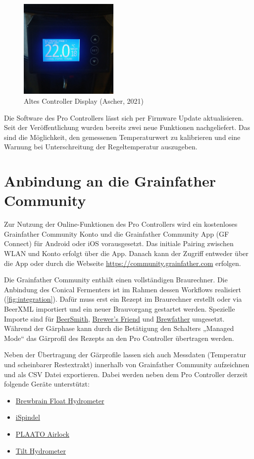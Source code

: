 \documentclass[a4paper,parskip=half]{scrartcl}
\begin{document}
\begin{figure}[H]
\centering
\includegraphics[width=4.8cm]{images/gfpc_display_old_main.jpg}
\caption{Altes Controller Display (Ascher, 2021)}
\label{fig:displayoldmain}
\end{figure}

Die Software des Pro Controllers lässt sich per Firmware Update
aktualisieren. Seit der Veröffentlichung wurden bereits zwei
neue Funktionen nachgeliefert. Das sind die Möglichkeit, den
gemessenen Temperaturwert zu kalibrieren und eine Warnung
bei Unterschreitung der Regeltemperatur auszugeben.

\section*{Anbindung an die Grainfather Community}

Zur Nutzung der Online-Funktionen des Pro Controllers wird ein
kostenloses Grainfather Community Konto und die Grainfather
Community App (GF Connect) für Android oder iOS vorausgesetzt.
Das initiale Pairing zwischen WLAN und Konto erfolgt über die App.
Danach kann der Zugriff entweder über die App oder durch die
Webseite \url{https://community.grainfather.com} erfolgen.

Die Grainfather Community enthält einen vollständigen
Braurechner. Die Anbindung des Conical Fermenters ist
im Rahmen dessen Workflows realisiert (\autoref{fig:integration}).
Dafür muss erst ein Rezept im Braurechner erstellt oder
via BeerXML importiert und ein neuer Brauvorgang gestartet werden.
Spezielle Importe sind für \href{https://beersmith.com}{BeerSmith},
\href{https://www.brewersfriend.com}{Brewer's Friend} und
\href{https://brewfather.app}{Brewfather} umgesetzt. Während
der Gärphase kann durch die Betätigung den Schalters „Managed Mode“
das Gärprofil des Rezepts an den Pro Controller übertragen werden.

Neben der Übertragung der Gärprofile lassen sich auch
Messdaten (Temperatur und scheinbarer Restextrakt) innerhalb von Grainfather Community aufzeichnen und als CSV Datei exportieren. Dabei werden neben dem Pro Controller derzeit folgende
Geräte unterstützt:
\begin{itemize}
\item \href{https://brewbrain.nl}{Brewbrain Float Hydrometer}
\item \href{https://www.ispindel.de}{iSpindel}
\item \href{https://plaato.io/products/plaato-airlock}{PLAATO Airlock} 
\item \href{https://tilthydrometer.com}{Tilt Hydrometer}
\end{itemize}
\end{document}
